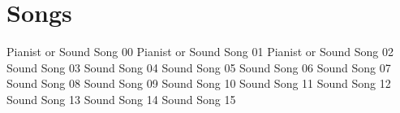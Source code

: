 \section{Songs}
Pianist or Sound Song 00
Pianist or Sound Song 01
Pianist or Sound Song 02
Sound Song 03
Sound Song 04
Sound Song 05
Sound Song 06
Sound Song 07
Sound Song 08
Sound Song 09
Sound Song 10
Sound Song 11
Sound Song 12
Sound Song 13
Sound Song 14
Sound Song 15
